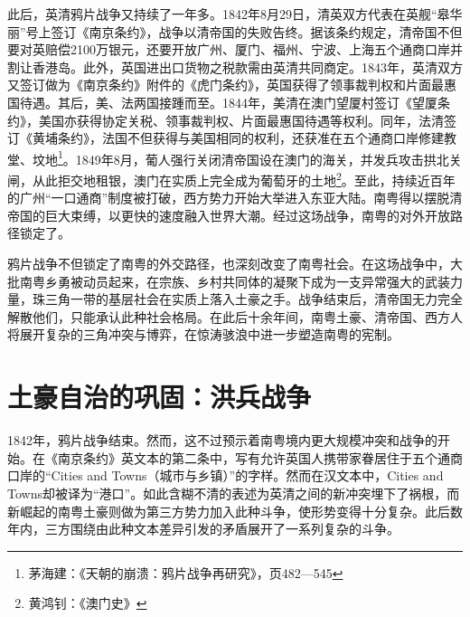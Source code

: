 此后，英清鸦片战争又持续了一年多。1842年8月29日，清英双方代表在英舰“皋华丽”号上签订《南京条约》，战争以清帝国的失败告终。据该条约规定，清帝国不但要对英赔偿2100万银元，还要开放广州、厦门、福州、宁波、上海五个通商口岸并割让香港岛。此外，英国进出口货物之税款需由英清共同商定。1843年，英清双方又签订做为《南京条约》附件的《虎门条约》，英国获得了领事裁判权和片面最惠国待遇。其后，美、法两国接踵而至。1844年，美清在澳门望厦村签订《望厦条约》，美国亦获得协定关税、领事裁判权、片面最惠国待遇等权利。同年，法清签订《黄埔条约》，法国不但获得与美国相同的权利，还获准在五个通商口岸修建教堂、坟地\footnote{茅海建：《天朝的崩溃：鸦片战争再研究》，页482—545}。1849年8月，葡人强行关闭清帝国设在澳门的海关，并发兵攻击拱北关闸，从此拒交地租银，澳门在实质上完全成为葡萄牙的土地\footnote{黄鸿钊：《澳门史》}。至此，持续近百年的广州“一口通商”制度被打破，西方势力开始大举进入东亚大陆。南粤得以摆脱清帝国的巨大束缚，以更快的速度融入世界大潮。经过这场战争，南粤的对外开放路径锁定了。

鸦片战争不但锁定了南粤的外交路径，也深刻改变了南粤社会。在这场战争中，大批南粤乡勇被动员起来，在宗族、乡村共同体的凝聚下成为一支异常强大的武装力量，珠三角一带的基层社会在实质上落入土豪之手。战争结束后，清帝国无力完全解散他们，只能承认此种社会格局。在此后十余年间，南粤土豪、清帝国、西方人将展开复杂的三角冲突与博弈，在惊涛骇浪中进一步塑造南粤的宪制。

\section{土豪自治的巩固：洪兵战争}

\indent 1842年，鸦片战争结束。然而，这不过预示着南粤境内更大规模冲突和战争的开始。在《南京条约》英文本的第二条中，写有允许英国人携带家眷居住于五个通商口岸的“Cities and Towns（城市与乡镇）”的字样。然而在汉文本中，Cities and Towns却被译为“港口”。如此含糊不清的表述为英清之间的新冲突埋下了祸根，而新崛起的南粤土豪则做为第三方势力加入此种斗争，使形势变得十分复杂。此后数年内，三方围绕由此种文本差异引发的矛盾展开了一系列复杂的斗争。

